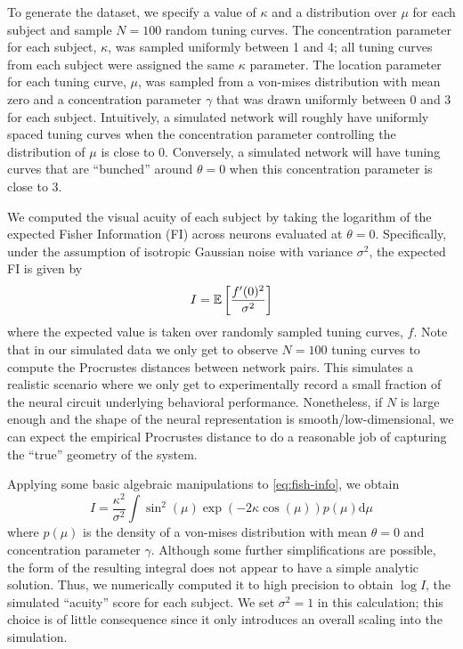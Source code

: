 To generate the dataset, we specify a value of $\kappa$ and a distribution over $\mu$ for each subject and sample $N=100$ random tuning curves.
The concentration parameter for each subject, $\kappa$, was sampled uniformly between 1 and 4; all tuning curves from each subject were assigned the same $\kappa$ parameter.
The location parameter for each tuning curve, $\mu$, was sampled from a von-mises distribution with mean zero and a concentration parameter $\gamma$ that was drawn uniformly between 0 and 3 for each subject.
Intuitively, a simulated network will roughly have uniformly spaced tuning curves when the concentration parameter controlling the distribution of $\mu$ is close to 0.
Conversely, a simulated network will have tuning curves that are ``bunched'' around $\theta=0$ when this concentration parameter is close to 3.

We computed the visual acuity of each subject by taking the logarithm of the expected Fisher Information (FI) across neurons evaluated at $\theta=0$.
Specifically, under the assumption of isotropic Gaussian noise with variance $\sigma^2$, the expected FI is given by
\begin{equation}
\label{eq:fish-info}
I = \mathbb{E} \left [ \frac{f'(0)^2}{\sigma^2} \right ] 
\end{equation}
where the expected value is taken over randomly sampled tuning curves, $f$.
Note that in our simulated data we only get to observe $N=100$ tuning curves to compute the Procrustes distances between network pairs.
This simulates a realistic scenario where we only get to experimentally record a small fraction of the neural circuit underlying behavioral performance.
Nonetheless, if $N$ is large enough and the shape of the neural representation is smooth/low-dimensional, we can expect the empirical Procrustes distance to do a reasonable job of capturing the ``true'' geometry of the system.

Applying some basic algebraic manipulations to \cref{eq:fish-info}, we obtain
\begin{equation}
I = \frac{\kappa^2}{\sigma^2} \int \sin^2(\mu) \exp(-2\kappa \cos(\mu)) p(\mu) \textrm{d}\mu
\end{equation}
where $p(\mu)$ is the density of a von-mises distribution with mean $\theta=0$ and concentration parameter $\gamma$.
Although some further simplifications are possible, the form of the resulting integral does not appear to have a simple analytic solution.
Thus, we numerically computed it to high precision to obtain $\log I$, the simulated ``acuity'' score for each subject.
We set $\sigma^2 = 1$ in this calculation; this choice is of little consequence since it only introduces an overall scaling into the simulation.


